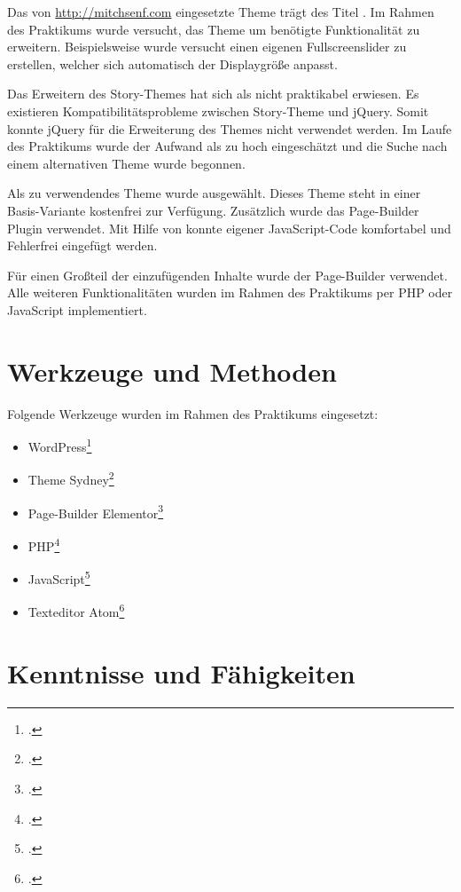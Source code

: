 Das von \url{http://mitchsenf.com} eingesetzte Theme trägt des Titel . Im Rahmen des Praktikums wurde versucht, das Theme um benötigte Funktionalität zu erweitern. Beispielsweise wurde versucht einen eigenen Fullscreenslider zu erstellen, welcher sich automatisch der Displaygröße anpasst.

Das Erweitern des Story-Themes hat sich als nicht praktikabel erwiesen. Es existieren Kompatibilitätsprobleme zwischen Story-Theme und jQuery. Somit konnte jQuery für die Erweiterung des Themes nicht verwendet werden. Im Laufe des Praktikums wurde der Aufwand als zu hoch eingeschätzt und die Suche nach einem alternativen Theme wurde begonnen.

Als zu verwendendes Theme wurde  ausgewählt. Dieses Theme steht in einer Basis-Variante kostenfrei zur Verfügung. Zusätzlich wurde das Page-Builder Plugin  verwendet. Mit Hilfe von  konnte eigener JavaScript-Code komfortabel und Fehlerfrei eingefügt werden.

Für einen Großteil der einzufügenden Inhalte wurde der Page-Builder  verwendet. Alle weiteren Funktionalitäten wurden im Rahmen des Praktikums per PHP oder JavaScript implementiert.


\section{Werkzeuge und Methoden}


Folgende Werkzeuge wurden im Rahmen des Praktikums eingesetzt:

\begin{itemize}
	\item WordPress\footcite{wordpress-homepage}
	\item Theme Sydney\footcite{sydney-homepage}
	\item Page-Builder Elementor\footcite{elementor-homepage}
	\item PHP\footcite{php-homepage}
	\item JavaScript\footcite{javascript-homepage}
	\item Texteditor Atom\footcite{atom-homepage}
\end{itemize}


\section{Kenntnisse und Fähigkeiten}

